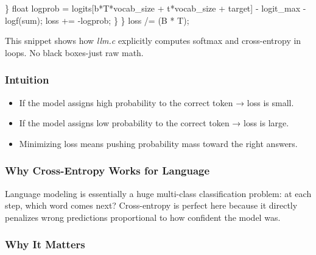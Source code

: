 \documentclass[
  letterpaper,
  DIV=11,
  numbers=noendperiod]{scrreprt}
\newenvironment{Shaded}{\begin{snugshade}}{\end{snugshade}}
\newcommand{\DataTypeTok}[1]{\textcolor[rgb]{0.68,0.00,0.00}{#1}}
\newcommand{\NormalTok}[1]{\textcolor[rgb]{0.00,0.23,0.31}{#1}}
\newcommand{\OperatorTok}[1]{\textcolor[rgb]{0.37,0.37,0.37}{#1}}
\providecommand{\tightlist}{%
  \setlength{\itemsep}{0pt}\setlength{\parskip}{0pt}}
\begin{document}
\begin{Shaded}
\begin{Highlighting}[]
        \OperatorTok{\}}
        \DataTypeTok{float}\NormalTok{ logprob }\OperatorTok{=}\NormalTok{ logits}\OperatorTok{[}\NormalTok{b}\OperatorTok{*}\NormalTok{T}\OperatorTok{*}\NormalTok{vocab\_size }\OperatorTok{+}\NormalTok{ t}\OperatorTok{*}\NormalTok{vocab\_size }\OperatorTok{+}\NormalTok{ target}\OperatorTok{]} \OperatorTok{{-}}\NormalTok{ logit\_max }\OperatorTok{{-}}\NormalTok{ logf}\OperatorTok{(}\NormalTok{sum}\OperatorTok{);}
\NormalTok{        loss }\OperatorTok{+=} \OperatorTok{{-}}\NormalTok{logprob}\OperatorTok{;}
    \OperatorTok{\}}
\OperatorTok{\}}
\NormalTok{loss }\OperatorTok{/=} \OperatorTok{(}\NormalTok{B }\OperatorTok{*}\NormalTok{ T}\OperatorTok{);}
\end{Highlighting}
\end{Shaded}

This snippet shows how \emph{llm.c} explicitly computes softmax and
cross-entropy in loops. No black boxes-just raw math.

\subsubsection{Intuition}\label{intuition}

\begin{itemize}
\tightlist
\item
  If the model assigns high probability to the correct token → loss is
  small.
\item
  If the model assigns low probability to the correct token → loss is
  large.
\item
  Minimizing loss means pushing probability mass toward the right
  answers.
\end{itemize}

\subsubsection{Why Cross-Entropy Works for
Language}\label{why-cross-entropy-works-for-language}

Language modeling is essentially a huge multi-class classification
problem: at each step, which word comes next? Cross-entropy is perfect
here because it directly penalizes wrong predictions proportional to how
confident the model was.

\subsubsection{Why It Matters}\label{why-it-matters-17}
\end{document}
